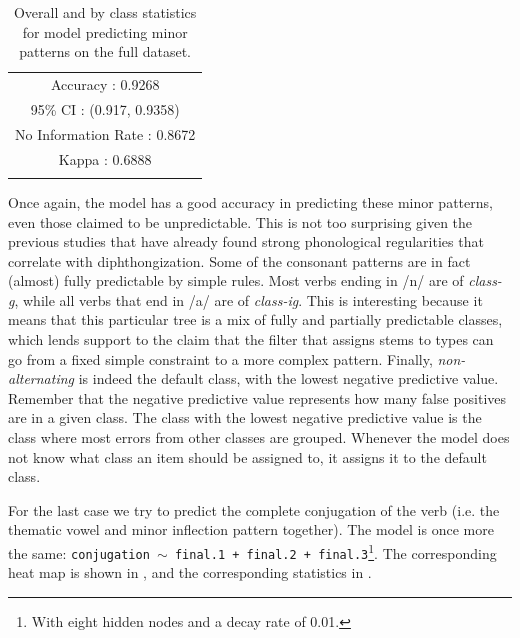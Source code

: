 \begin{table}
    \small
  \centering
  \begin{tabular}{lrrrrrr}
    \lsptoprule
    \multicolumn{7}{c}{Overall Statistics}           \\
    \midrule
    \multicolumn{7}{c}{Accuracy : 0.9268}            \\
    \multicolumn{7}{c}{95\% CI : (0.917, 0.9358)}    \\
    \multicolumn{7}{c}{No Information Rate : 0.8672} \\
    \multicolumn{7}{c}{Kappa : 0.6888}               \\
    \lspbottomrule
  \end{tabular}
  \caption{Overall and by class statistics for model predicting minor patterns on the full dataset.} \label{tab:spanish-verbs-minor-v-stats-full}
\end{table}

\newpage 
Once again, the model has a good accuracy in predicting these minor patterns, even those claimed to be unpredictable. This is not too surprising given the previous studies that have already found strong phonological regularities that correlate with diphthongization. Some of the consonant patterns are in fact (almost) fully predictable by simple rules. Most verbs ending in /n/ are of \textit{class-g}, while all verbs that end in /a/ are of \textit{class-ig}. This is interesting because it means that this particular tree is a mix of fully and partially predictable classes, which lends support to the claim that the filter that assigns stems to types can go from a fixed simple constraint to a more complex pattern. Finally, \textit{non-alternating} is indeed the default class, with the lowest negative predictive value. Remember that the negative predictive value represents how many false positives are in a given class. The class with the lowest negative predictive value is the class where most errors from other classes are grouped. Whenever the model does not know what class an item should be assigned to, it assigns it to the default class.

For the last case we try to predict the complete conjugation of the verb (i.e. the thematic vowel and minor inflection pattern together). The model is once more the same: \texttt{conjugation $\sim$ final.1 + final.2 + final.3}\footnote{With eight hidden nodes and a decay rate of 0.01.}. The corresponding heat map is shown in , and the corresponding statistics in .

